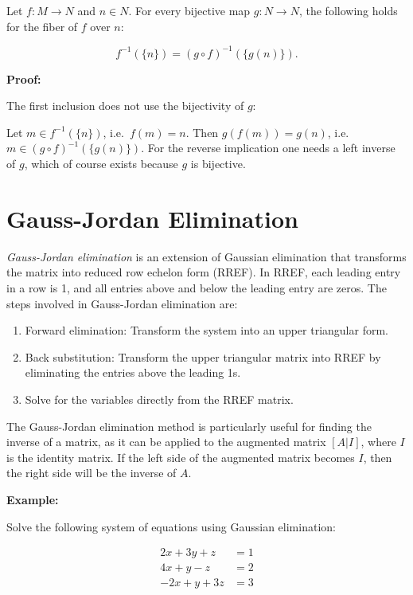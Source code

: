 Let \( f : M \to N \) and \( n \in N \). For every bijective map \( g : N \to N \), the following holds for the fiber of \( f \) over \( n \):

\[
    f^{-1}(\{n\}) = (g \circ f)^{-1}(\{g(n)\}).
\]

\textbf{Proof:}

The first inclusion does not use the bijectivity of \( g \):

Let \( m \in f^{-1}(\{n\}) \), i.e.\ \( f(m) = n \). Then \( g(f(m)) = g(n) \), i.e.\ \( m \in (g \circ f)^{-1}(\{g(n)\}) \).
For the reverse implication one needs a left inverse of \( g \), which of course exists because \( g \) is bijective.

\QED 

\section{Gauss-Jordan Elimination}

\emph{Gauss-Jordan elimination} is an extension of Gaussian elimination that transforms the matrix into reduced row echelon form (RREF). In RREF, each 
leading entry in a row is 1, and all entries above and below the leading entry are zeros. The steps involved in Gauss-Jordan elimination are:

\begin{enumerate}

    \item Forward elimination: Transform the system into an upper triangular form.

    \item Back substitution: Transform the upper triangular matrix into RREF by eliminating the entries
          above the leading 1s.

    \item Solve for the variables directly from the RREF matrix.

\end{enumerate}

The Gauss-Jordan elimination method is particularly useful for finding the inverse of a matrix, as it can be applied to the augmented matrix \([A | I]\), 
where \(I\) is the identity matrix. If the left side of the augmented matrix becomes \(I\), then the right side will be the inverse of \(A\).

\textbf{Example:}

Solve the following system of equations using Gaussian elimination:

\begin{align*}
    2x + 3y + z  & = 1 \\
    4x + y - z   & = 2 \\
    -2x + y + 3z & = 3
\end{align*}

